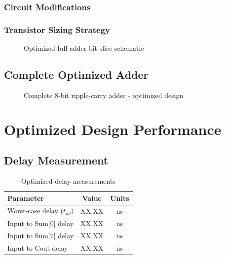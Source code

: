 \documentclass[12pt,letterpaper]{article}
\begin{document}
\subsubsection{Circuit Modifications}

\subsubsection{Transistor Sizing Strategy}

\begin{figure}[H]
    \centering
    \caption{Optimized full adder bit-slice schematic}
    \label{fig:optimized_bitslice}
\end{figure}

\subsection{Complete Optimized Adder}

\begin{figure}[H]
    \centering
    \caption{Complete 8-bit ripple-carry adder - optimized design}
    \label{fig:optimized_8bit}
\end{figure}

\section{Optimized Design Performance}
\label{sec:optimized_metrics}


\subsection{Delay Measurement}

\begin{table}[H]
\centering
\caption{Optimized delay measurements}
\label{tab:optimized_delay}
\begin{tabular}{@{}lcc@{}}
\toprule
\textbf{Parameter} & \textbf{Value} & \textbf{Units} \\
\midrule
Worst-case delay ($t_{pd}$) & XX.XX & ns \\
Input to Sum[0] delay & XX.XX & ns \\
Input to Sum[7] delay & XX.XX & ns \\
Input to Cout delay & XX.XX & ns \\
\bottomrule
\end{tabular}
\end{table}
\end{document}
